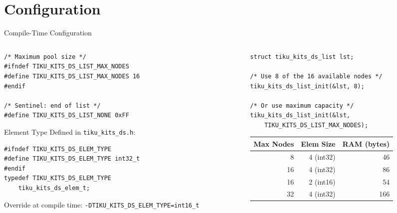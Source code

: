 \documentclass[aspectratio=169, 10pt]{beamer}
\begin{document}
\section{Configuration}

\begin{frame}[fragile]{Compile-Time Configuration}
\begin{columns}[T]
\begin{column}{0.48\textwidth}
\begin{lstlisting}[style=cstyle,
  title={Configurable parameters}]
/* Maximum pool size */
#ifndef TIKU_KITS_DS_LIST_MAX_NODES
#define TIKU_KITS_DS_LIST_MAX_NODES 16
#endif

/* Sentinel: end of list */
#define TIKU_KITS_DS_LIST_NONE 0xFF
\end{lstlisting}

\vspace{0.3em}
\begin{block}{Element Type}
Defined in \texttt{tiku\_kits\_ds.h}:
\begin{lstlisting}[style=cstyle]
#ifndef TIKU_KITS_DS_ELEM_TYPE
#define TIKU_KITS_DS_ELEM_TYPE int32_t
#endif
typedef TIKU_KITS_DS_ELEM_TYPE
    tiku_kits_ds_elem_t;
\end{lstlisting}
Override at compile time:
\texttt{-DTIKU\_KITS\_DS\_ELEM\_TYPE=int16\_t}
\end{block}
\end{column}

\begin{column}{0.48\textwidth}
\begin{lstlisting}[style=cstyle,
  title={Runtime initialization}]
struct tiku_kits_ds_list lst;

/* Use 8 of the 16 available nodes */
tiku_kits_ds_list_init(&lst, 8);

/* Or use maximum capacity */
tiku_kits_ds_list_init(&lst,
    TIKU_KITS_DS_LIST_MAX_NODES);
\end{lstlisting}

\vspace{0.3em}
\begin{table}
\centering
\scriptsize
\begin{tabular}{@{}rrr@{}}
\toprule
\textbf{Max Nodes} & \textbf{Elem Size} & \textbf{RAM (bytes)} \\
\midrule
8  & 4 (int32)  & 46 \\
16 & 4 (int32)  & 86 \\
16 & 2 (int16)  & 54 \\
32 & 4 (int32)  & 166 \\
\bottomrule
\end{tabular}
\end{table}
\end{column}
\end{columns}
\end{frame}
\end{document}
